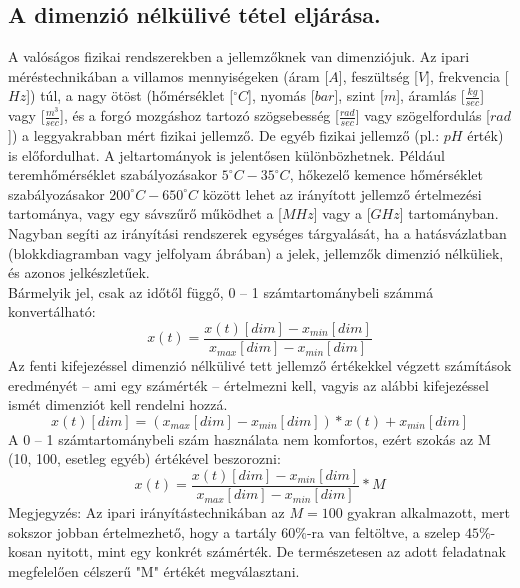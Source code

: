 \documentclass[11pt,a4paper]{article}
\begin{document}
\subsection{A dimenzió nélkülivé tétel eljárása.}
A valóságos fizikai rendszerekben a jellemzőknek van dimenziójuk. Az ipari méréstechnikában a villamos mennyiségeken (áram [$A$], feszültség [$V$], frekvencia
[$Hz$]) túl, a nagy ötöst (hőmérséklet [$^\circ C$], nyomás [$bar$], szint [$m$], áramlás [$\frac{kg}{sec}$] vagy
[$\frac{m^3}{sec}$], és a forgó mozgáshoz tartozó szögsebesség [$\frac{rad}{sec}$] vagy szögelfordulás [$rad$]) a leggyakrabban mért fizikai jellemző. De egyéb fizikai jellemző (pl.: $pH$ érték) is előfordulhat.
A jeltartományok is jelentősen különbözhetnek. Például teremhőmérséklet szabályozásakor $5 ^\circ C-35 ^\circ C$, hőkezelő kemence hőmérséklet szabályozásakor $200 ^\circ C-650 ^ \circ C$ között lehet az irányított jellemző értelmezési tartománya, vagy egy sávszűrő
működhet a [$MHz$] vagy a [$GHz$] tartományban.
Nagyban segíti az irányítási rendszerek egységes tárgyalását, ha a hatásvázlatban
(blokkdiagramban vagy jelfolyam ábrában) a jelek, jellemzők dimenzió nélküliek,
és azonos jelkészletűek.$$$$
Bármelyik jel, csak az időtől függő, {0 – 1} számtartománybeli számmá konvertálható:$$x\left(t\right)= \frac{x\left(t\right)\left[dim\right]-x_{min}\left[dim\right]}{x_{max}\left[dim\right]-x_{min}\left[dim\right]}$$
Az fenti kifejezéssel dimenzió nélkülivé tett jellemző értékekkel végzett számítások eredményét – ami egy számérték – értelmezni kell, vagyis az alábbi kifejezéssel ismét dimenziót kell rendelni hozzá.
$$x\left(t\right)\left[dim\right]=\left(x_{max}\left[dim\right]-x_{min}\left[dim\right]\right)*x\left(t\right)+x_{min}\left[dim\right]$$
A {0 – 1} számtartománybeli szám használata nem komfortos, ezért szokás az M (10, 100, esetleg egyéb) értékével beszorozni:
$$x\left(t\right)= \frac{x\left(t\right)\left[dim\right]-x_{min}\left[dim\right]}{x_{max}\left[dim\right]-x_{min}\left[dim\right]} * M$$
Megjegyzés: Az ipari irányítástechnikában az $M=100$ gyakran alkalmazott,
mert sokszor jobban értelmezhető, hogy a tartály $60\%$-ra van feltöltve, a szelep $45\%$-kosan nyitott, mint egy konkrét számérték. De természetesen az adott feladatnak megfelelően
célszerű "M" értékét megválasztani.
\end{document}
